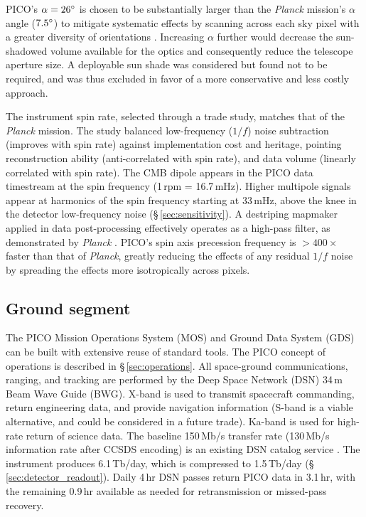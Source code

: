 PICO's $\alpha=26^\circ$ is chosen to be substantially larger than
the \textit{Planck} mission's $\alpha$ angle ($7.5^\circ$) to
mitigate systematic effects by scanning across each sky pixel with a
greater diversity of orientations \citep{Hu2003}. Increasing $\alpha$
further would decrease the sun-shadowed volume available for the
optics and consequently reduce the telescope aperture size. A
deployable sun shade was considered but found not to be required, and
was thus excluded in favor of a more conservative and less costly
approach.

The instrument spin rate, selected through a trade study, matches that
of the \textit{Planck} mission. The study balanced low-frequency
($1/f$) noise subtraction (improves with spin rate) against
implementation cost and heritage, pointing reconstruction ability
(anti-correlated with spin rate), and data volume (linearly correlated
with spin rate).  The CMB dipole appears in the PICO data timestream
at the spin frequency (1\,rpm = 16.7\,mHz). Higher multipole signals
appear at harmonics of the spin frequency starting at 33\,mHz, above
the knee in the detector low-frequency noise
(\S\,\ref{sec:sensitivity}). A destriping mapmaker applied in data
post-processing effectively operates as a high-pass filter, as
demonstrated by \textit{Planck} \citep{Kurki-Suonio2009}. PICO's spin
axis precession frequency is $>400\times$ faster than that of
\textit{Planck}, greatly reducing the effects of any residual $1/f$
noise by spreading the effects more isotropically across pixels.

\subsection{Ground segment}
\label{sec:ground_segment} %

The PICO Mission Operations System (MOS) and Ground Data System (GDS)
can be built with extensive reuse of standard tools. The PICO concept
of operations is described in \S\,\ref{sec:operations}. 
All space-ground communications, ranging, and tracking are performed
by the Deep Space Network (DSN) 34\,m Beam Wave Guide (BWG). X-band is
used to transmit spacecraft commanding, return engineering data, and
provide navigation information (S-band is a viable alternative, and
could be considered in a future trade). Ka-band is used for high-rate
return of science data.  The baseline 150\,Mb/s transfer rate
(130\,Mb/s information rate after CCSDS encoding) is an existing DSN
catalog service \cite{DSN2015}.  The instrument produces 6.1\,Tb/day,
which is compressed to 1.5\,Tb/day
(\S\,\ref{sec:detector_readout}). Daily 4\,hr DSN passes return PICO
data in 3.1\,hr, with the remaining 0.9\,hr available as needed for
retransmission or missed-pass recovery.


